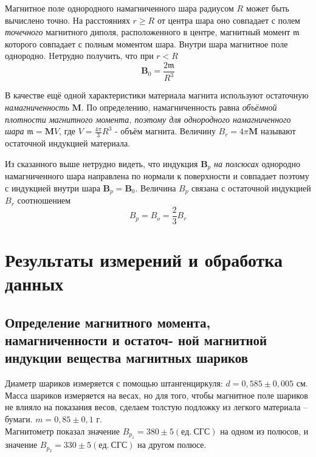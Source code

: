 \documentclass[a4paper,12pt]{article}
\begin{document}
Магнитное поле однородного намагниченного шара радиусом $R$ может быть вычислено точно. На расстояниях $r \geq R$ от центра шара оно совпадает с полем \textit{точечного} магнитного диполя, расположенного в центре, магнитный момент $\mathfrak{m}$ которого совпадает с полным моментом шара. Внутри шара магнитное поле однородно. Hетрудно получить, что при $r < R$ \[\textbf{B}_{0} = \frac{2\mathfrak{m}}{R^3}\]

В качестве ещё одной характеристики материала магнита используют остаточную \textit{намагниченность} $\textbf{M}$. По определению, намагниченность равна \textit{объёмной плотности магнитного момента, поэтому для однородного намагниченного шара} $\mathfrak{m}= \textbf{M}V $, где $V = \frac{4\pi}{3}R^3$ - объём магнита. Величину $B_r = 4\pi \textbf{M}$ называют остаточной индукцией материала.

Из сказанного выше нетрудно видеть, что индукция $\textbf{B}_p$ \textit{на полсюсах} однородно намагниченного шара направлена по нормали к поверхности и совпадает поэтому с индукцией внутри шара $\textbf{B}_p = \textbf{B}_0$. Величина $B_p$ связана с остаточной индукцией $B_r$ соотношением \[B_p = B_o = \frac{2}{3}B_r \]

\section{Результаты измерений и обработка данных}
\subsection{Определение магнитного момента, намагниченности и остаточ- ной магнитной индукции вещества магнитных шариков}

Диаметр шариков измеряется с помощью штангенциркуля: $d = 0,585 \pm 0,005 $ см. \\
Масса шариков измеряется на весах, но для того, чтобы магнитное поле шариков не влияло на показания весов, сделаем толстую подложку из легкого материала -- бумаги. $m = 0,85 \pm 0,1 $ г. \\
Магнитометр показал значение $B_{p_1} = 380 \pm 5 (ед. \ СГС)$ на одном из полюсов, и значение $B_{p_2} = 330 \pm 5 (ед. \ СГС)$ на другом полюсе.
\end{document}
